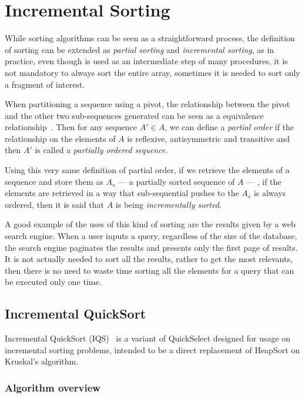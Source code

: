 
\section{Incremental Sorting}
\label{SEC:INCREMENTAL_SORTING}

While sorting algorithms can be seen as a straightforward process, the definition of sorting can be extended as \textit{partial sorting} and \textit{incremental sorting}, as in practice, even though is used as an intermediate step of many procedures, it is not mandatory to always sort the entire array, sometimes it is needed to sort only a fragment of interest.

When partitioning a sequence using a pivot, the relationship between the pivot and the other two sub-sequences generated can be seen as a equivalence relationship~\cite{10.5555/1614191}. Then for any sequence $A' \in A$, we can define a \textit{partial order} if the relationship on the elements of $A$ is reflexive, antisymmetric and transitive and then $A'$ is called a \textit{partially ordered sequence}.

Using this very same definition of partial order, if we retrieve the elements of a sequence and store them as $A_s$ --- a partially sorted sequence of $A$ --- , if the elements are retrieved in a way that sub-sequential pushes to the $A_s$ is always ordered, then it is said that $A$ is being \textit{incrementally sorted}.

A good example of the uses of this kind of sorting are the results given by a web search engine. When a user inputs a query, regardless of the size of the database, the search engine paginates the results and presents only the first page of results. It is not actually needed to sort all the results, rather to get the most relevants, then there is no need to waste time sorting all the elements for a query that can be executed only one time.

\subsection{Incremental QuickSort}
Incremental QuickSort (IQS)~\cite{Navarro_Paredes_2010} is a variant of QuickSelect designed for usage on incremental sorting problems, intended to be a direct replacement of HeapSort on Kruskal's algorithm.

\subsubsection{Algorithm overview}


